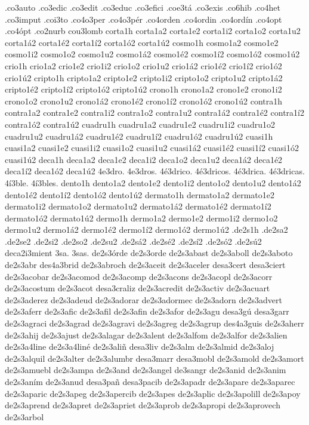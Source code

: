 {.co3auto
.co3edic
.co3edit
.co3educ
.co3efici
.coe3tá
.co3exis
.co6hib
.co4het
.co3imput
.coi3to
.co4o3per
.co4o3pér
.co4orden
.co4ordin
.co4ordín
.co4opt
.co4ópt
.co2nurb
cou3lomb
corta1h
corta1a2 corta1e2 corta1i2 corta1o2 corta1u2
corta1á2 corta1é2 corta1í2 corta1ó2 corta1ú2
cosmo1h
cosmo1a2 cosmo1e2 cosmo1i2 cosmo1o2 cosmo1u2
cosmo1á2 cosmo1é2 cosmo1í2 cosmo1ó2 cosmo1ú2
crio1h
crio1a2 crio1e2 crio1i2 crio1o2 crio1u2
crio1á2 crio1é2 crio1í2 crio1ó2 crio1ú2
cripto1h
cripto1a2 cripto1e2 cripto1i2 cripto1o2 cripto1u2
cripto1á2 cripto1é2 cripto1í2 cripto1ó2 cripto1ú2
crono1h
crono1a2 crono1e2 crono1i2 crono1o2 crono1u2
crono1á2 crono1é2 crono1í2 crono1ó2 crono1ú2
contra1h
contra1a2 contra1e2 contra1i2 contra1o2 contra1u2
contra1á2 contra1é2 contra1í2 contra1ó2 contra1ú2
cuadru1h
cuadru1a2 cuadru1e2 cuadru1i2 cuadru1o2 cuadru1u2
cuadru1á2 cuadru1é2 cuadru1í2 cuadru1ó2 cuadru1ú2
cuasi1h
cuasi1a2 cuasi1e2 cuasi1i2 cuasi1o2 cuasi1u2
cuasi1á2 cuasi1é2 cuasi1í2 cuasi1ó2 cuasi1ú2
deca1h
deca1a2 deca1e2 deca1i2 deca1o2 deca1u2
deca1á2 deca1é2 deca1í2 deca1ó2 deca1ú2
4e3dro.
4e3dros.
4é3drico.
4é3dricos.
4é3drica.
4é3dricas.
4í3ble.
4í3bles.
dento1h
dento1a2 dento1e2 dento1i2 dento1o2 dento1u2
dento1á2 dento1é2 dento1í2 dento1ó2 dento1ú2
dermato1h
dermato1a2 dermato1e2 dermato1i2 dermato1o2 dermato1u2
dermato1á2 dermato1é2 dermato1í2 dermato1ó2 dermato1ú2
dermo1h
dermo1a2 dermo1e2 dermo1i2 dermo1o2 dermo1u2
dermo1á2 dermo1é2 dermo1í2 dermo1ó2 dermo1ú2
.de2s1h
.de2sa2 .de2se2 .de2si2 .de2so2 .de2su2
.de2sá2 .de2sé2 .de2sí2 .de2só2 .de2sú2
deca2i3mient
3sa.
3sas.
de2s3órde
de2s3orde
de2s3abast
de2s3aboll
de2s3aboto
de2s3abr
des4a3brid
de2s3abroch
de2s3aceit
de2s3aceler
desa3cert
desa3ciert
de2s3acobar
de2s3acomod
de2s3acomp
de2s3acons
de2s3acopl
de2s3acorr
de2s3acostum
de2s3acot
desa3craliz
de2s3acredit
de2s3activ
de2s3acuart
de2s3aderez
de2s3adeud
de2s3adorar
de2s3adormec
de2s3adorn
de2s3advert
de2s3aferr
de2s3afic
de2s3afil
de2s3afin
de2s3afor
de2s3agu
desa3gú
desa3garr
de2s3agraci
de2s3agrad
de2s3agravi
de2s3agreg
de2s3agrup
des4a3guis
de2s3aherr
de2s3ahij
de2s3ajust
de2s3alagar
de2s3alent
de2s3alfom
de2s3alfor
de2s3alien
de2s3a4line
de2s3a4liné
de2s3aliñ
desa3liv
de2s3alm
de2s3almid
de2s3aloj
de2s3alquil
de2s3alter
de2s3alumbr
desa3marr
desa3mobl
de2s3amold
de2s3amort
de2s3amuebl
de2s3ampa
de2s3and
de2s3angel
de3sangr
de2s3anid
de2s3anim
de2s3aním
de2s3anud
desa3pañ
desa3pacib
de2s3apadr
de2s3apare
de2s3aparec
de2s3aparic
de2s3apeg
de2s3apercib
de2s3apes
de2s3aplic
de2s3apolill
de2s3apoy
de2s3aprend
de2s3apret
de2s3apriet
de2s3aprob
de2s3apropi
de2s3aprovech
de2s3arbol
}
